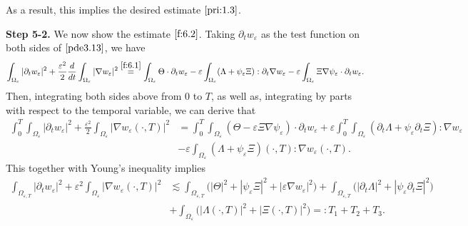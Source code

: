 \documentclass[13pt,CJK]{article}
\theoremstyle{plain}                       %
\theoremstyle{remark}
\numberwithin{equation}{section}
\begin{document}
As a result, this
implies the desired estimate $\eqref{pri:1.3}$.


\medskip

\textbf{Step 5-2.} We now show the estimate $\eqref{f:6.2}$.
Taking $\partial_t w_\varepsilon$ as the test function on both sides of
$\eqref{pde3.13}$, we have
\begin{equation}\label{}
 \int_{\Omega_\varepsilon}|\partial_t w_\varepsilon|^2
 + \frac{\varepsilon^2}{2}\frac{d}{dt}\int_{\Omega_\varepsilon}|\nabla w_\varepsilon|^2
 \overset{\eqref{f:6.1}}{=} \int_{\Omega_\varepsilon}\Theta\cdot \partial_tw_\varepsilon
 -\varepsilon\int_{\Omega_\varepsilon}(\Lambda+\psi_\varepsilon\Xi)
 :\partial_t\nabla w_\varepsilon
 -\varepsilon\int_{\Omega_\varepsilon}
 \Xi\nabla\psi_\varepsilon\cdot\partial_t w_\varepsilon.
\end{equation}
Then, integrating both sides above from $0$ to $T$, as well as, integrating by parts with respect to the temporal variable, we can derive that
\begin{equation*}
\begin{aligned}
\int_{0}^{T}\int_{\Omega_\varepsilon}|\partial_t w_\varepsilon|^2
+ \frac{\varepsilon^2}{2}\int_{\Omega_\varepsilon}|\nabla w_\varepsilon(\cdot,T)|^2
&= \int_{0}^{T}\int_{\Omega_\varepsilon}
(\Theta - \varepsilon\Xi\nabla\psi_\varepsilon)\cdot\partial_t w_\varepsilon
+\varepsilon\int_{0}^{T}\int_{\Omega_\varepsilon}
(\partial_t\Lambda+\psi_\varepsilon\partial_t\Xi):\nabla w_\varepsilon \\
&-\varepsilon\int_{\Omega_\varepsilon}
(\Lambda+\psi_\varepsilon\Xi)(\cdot,T):\nabla w_\varepsilon(\cdot,T).
\end{aligned}
\end{equation*}
This together with Young's inequality implies
\begin{equation}\label{f:6.4}
\begin{aligned}
 \int_{\Omega_{\varepsilon,T}}
 |\partial_t w_\varepsilon|^2
 + \varepsilon^2\int_{\Omega_\varepsilon}|\nabla w_\varepsilon(\cdot,T)|^2
 &\lesssim \int_{\Omega_{\varepsilon,T}}
 \big(|\Theta|^2
 + |\psi_\varepsilon\Xi|^2 + |\varepsilon\nabla w_\varepsilon|^2\big)
 + \int_{\Omega_{\varepsilon,T}}
 \big(|\partial_t \Lambda|^2 +|\psi_\varepsilon\partial_t\Xi|^2\big)\\
 &+\int_{\Omega_\varepsilon}\big(|\Lambda(\cdot,T)|^2
 + |\Xi(\cdot,T)|^2\big) =: T_1 + T_2 + T_3.
\end{aligned}
\end{equation}
\end{document}
